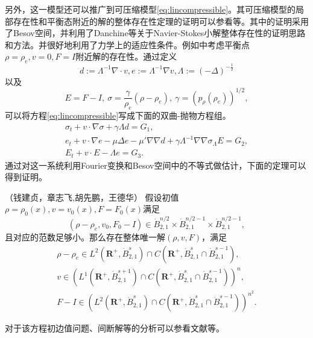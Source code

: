 另外，这一模型还可以推广到可压缩模型\eqref{eq:lincompressible}。其可压缩模型的局部存在性和平衡态附近的解的整体存在性定理的证明可以参看\cite{qian2010global,hu2011global,hu2012strong}等。其中的证明采用了Besov空间，并利用了Danchine等关于Navier-Stokes小解整体存在性的证明思路和方法\cite{danchin2000global}。并很好地利用了力学上的适应性条件。例如\cite{qian2010global}中考虑平衡点$\rho=\rho_e,v=0,F=I$附近解的存在性。通过定义
\begin{equation*}
	d:=\Lambda^{-1} \nabla \cdot v, e:= \Lambda^{-1} \nabla v, \Lambda :=(-\Delta)^{-\frac{1}{2}}
\end{equation*}
以及
\begin{equation*}
	E=F-I, \ \sigma = \frac{\gamma}{\rho_e} (\rho - \rho_e), \ \gamma = (p_{\rho}(\rho_e))^{1/2},
\end{equation*}
可以将方程\eqref{eq:lincompressible}写成下面的双曲-抛物方程组。
\begin{eqnarray*}
	\sigma_t + v \cdot \nabla \sigma + \gamma \Lambda d = G_1, \\
	e_t + v \cdot \nabla e - \mu \Delta e - \mu' \nabla \nabla d + \gamma \Lambda^{-1} \nabla \nabla \sigma _ \Lambda E = G_2, \\
	E_t + v \cdot E - \Lambda e = G_3.
\end{eqnarray*}
通过对这一系统利用Fourier变换和Besov空间中的不等式做估计，下面的定理可以得到证明。
\begin{theorem}（钱建贞，章志飞\cite{qian2010global},胡先鹏，王德华\cite{hu2011global}）
	假设初值$\rho=\rho_0(x),v=v_0(x),F=F_0(x)$满足
	\begin{equation*}
		(\rho - \rho_e,v_0,F_0-I) \in \dot{B}_{2,1}^{n/2} \times \dot{B}_{2,1}^{n/2-1} \times \dot{B}_{2,1}^{n/2-1},
	\end{equation*}
	且对应的范数足够小。那么存在整体唯一解$(\rho,v,F)$，满足
	\begin{eqnarray*}
		\rho - \rho_e \in L^2(\mathbf{R}^+,\dot{B}_{2,1}^s) \cap C(\mathbf{R}^+,\dot{B}_{2,1}^s\cap \dot{B}_{2,1}^{s-1}),\\
		v \in \left( L^1(\mathbf{R}^+,\dot{B}_{2,1}^{s+1}) \cap C(\mathbf{R}^+,\dot{B}_{2,1}^s \cap \dot{B}_{2,1}^{s-1}) \right)^n, \\
		F- I \in \left( L^2(\mathbf{R}^+,\dot{B}_{2,1}^s) \cap C(\mathbf{R}^+,\dot{B}_{2,1}^s \cap \dot{B}_{2,1}^{s-1}) \right)^{n^2}.
	\end{eqnarray*}
\end{theorem}

对于该方程初边值问题、间断解等的分析可以参看文献\cite{qian2011initial,lin2008initial,lei2010remarks,hu2012formation,hu2015global}等。

